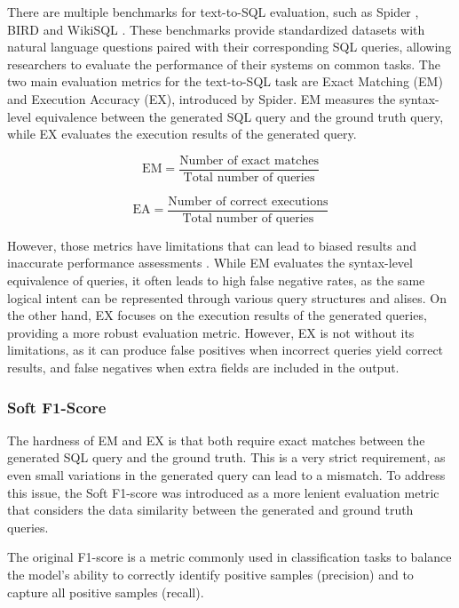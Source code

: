 There are multiple benchmarks for text-to-SQL evaluation, such as Spider \cite{yu_spider_2018}, BIRD \cite{li_can_2023} and WikiSQL \cite{zhongSeq2SQL2017}. These benchmarks provide standardized datasets with natural language questions paired with their corresponding SQL queries, allowing researchers to evaluate the performance of their systems on common tasks. The two main evaluation metrics for the text-to-SQL task are Exact Matching (EM) and Execution Accuracy (EX), introduced by Spider. EM measures the syntax-level equivalence between the generated SQL query and the ground truth query, while EX evaluates the execution results of the generated query.

\begin{equation}
    \text{EM} = \frac{\text{Number of exact matches}}{\text{Total number of queries}}
\end{equation}

\begin{equation}
    \text{EA} = \frac{\text{Number of correct executions}}{\text{Total number of queries}}
\end{equation}


However, those metrics have limitations that can lead to biased results and inaccurate performance assessments \cite{kim_flex_2024}. While EM evaluates the syntax-level equivalence of queries, it often leads to high false negative rates, as the same logical intent can be represented through various query structures and alises. On the other hand, EX focuses on the execution results of the generated queries, providing a more robust evaluation metric. However, EX is not without its limitations, as it can produce false positives when incorrect queries yield correct results, and false negatives when extra fields are included in the output.

\subsubsection{Soft F1-Score}

The hardness of EM and EX is that both require exact matches between the generated SQL query and the ground truth. This is a very strict requirement, as even small variations in the generated query can lead to a mismatch. To address this issue, the Soft F1-score was introduced as a more lenient evaluation metric that considers the data similarity between the generated and ground truth queries. 

The original F1-score is a metric commonly used in classification tasks to balance the model's ability to correctly identify positive samples (precision) and to capture all positive samples (recall). 

